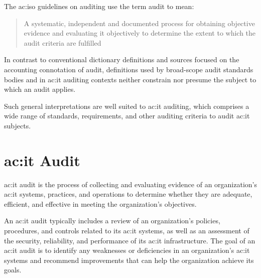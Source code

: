 The \gls{ac:iso} guidelines on auditing use the term audit to mean: \begin{quote} A systematic, independent and documented process for obtaining objective evidence and evaluating it objectively to determine the extent to which the audit criteria are fulfilled \citep{ISOISO1953}\end{quote}


In contrast to conventional dictionary definitions and sources focused on
the accounting connotation of audit, definitions used by broad-scope audit standards bodies and in \gls{ac:it} auditing contexts neither constrain nor presume the subject to which an audit applies.

Such general interpretations are well suited to \gls{ac:it} auditing, which comprises a wide range of standards, requirements, and other auditing criteria to audit \gls{ac:it} subjects.



\section{\gls{ac:it} Audit}\label{sec:it-audit}

\gls{ac:it} audit is the process of collecting and evaluating evidence of an organization's \gls{ac:it} systems, practices, and operations to determine whether they are adequate, efficient, and effective in meeting the organization's objectives. \citep{GANTZ20141}

An \gls{ac:it} audit typically includes a review of an organization's policies, procedures, and controls related to its \gls{ac:it} systems, as well as an assessment of the security, reliability, and performance of its \gls{ac:it} infrastructure. The goal of an \gls{ac:it} audit is to identify any weaknesses or deficiencies in an organization's \gls{ac:it} systems and recommend improvements that can help the organization achieve its goals.


